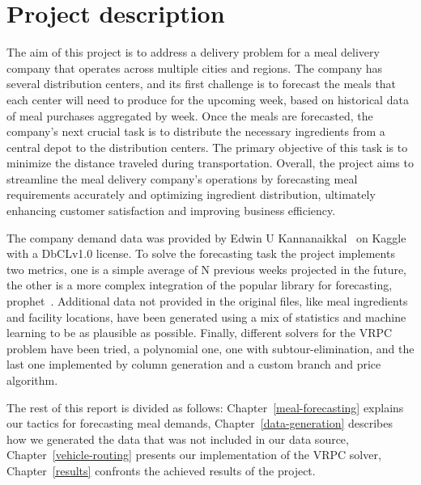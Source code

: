 \chapter{Project description}
\label{project-description}

The aim of this project is to address a delivery problem for a meal delivery company that operates across multiple cities and regions. The company has several distribution centers, and its first challenge is to forecast the meals that each center will need to produce for the upcoming week, based on historical data of meal purchases aggregated by week.
Once the meals are forecasted, the company's next crucial task is to distribute the necessary ingredients from a central depot to the distribution centers. The primary objective of this task is to minimize the distance traveled during transportation.
Overall, the project aims to streamline the meal delivery company's operations by forecasting meal requirements accurately and optimizing ingredient distribution, ultimately enhancing customer satisfaction and improving business efficiency.


The company demand data was provided by Edwin U Kannanaikkal~\cite{analyticsvidhya2020} on Kaggle with a DbCLv1.0 license.
To solve the forecasting task the project implements two metrics, one is a simple average of N previous weeks projected in the future, the other is a more complex integration of the popular library for forecasting, prophet~\cite{taylor2018forecasting}.
Additional data not provided in the original files, like meal ingredients and facility locations, have been generated using a mix of statistics and machine learning to be as plausible as possible.
Finally, different solvers for the VRPC problem have been tried, a polynomial one, one with subtour-elimination, and the last one implemented by column generation and a custom branch and price algorithm.

The rest of this report is divided as follows:
Chapter~\ref{meal-forecasting} explains our tactics for forecasting meal demands,
Chapter~\ref{data-generation} describes how we generated the data that was not included in our data source,
Chapter~\ref{vehicle-routing} presents our implementation of the VRPC solver,
Chapter~\ref{results} confronts the achieved results of the project.
